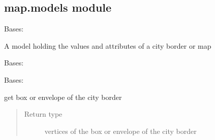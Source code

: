 \documentclass[letterpaper,10pt,english]{sphinxmanual}
\begin{document}
\subsection{map.models module}
\label{api/map:module-map.models}\label{api/map:map-models-module}

\begin{fulllineitems}
\label{api/map:map.models.CityBorder}
Bases: 

A model holding the values and attributes of a city border or map

\begin{fulllineitems}
\label{api/map:map.models.CityBorder.DoesNotExist}
Bases: 

\end{fulllineitems}


\begin{fulllineitems}
\label{api/map:map.models.CityBorder.MultipleObjectsReturned}
Bases: 

\end{fulllineitems}


\begin{fulllineitems}
\label{api/map:map.models.CityBorder.box}
get box or envelope of the city border
\begin{quote}\begin{description}
\item[{Return type}] \leavevmode
vertices of the box or envelope of the city border

\end{description}\end{quote}

\end{fulllineitems}



\end{fulllineitems}
\end{document}
